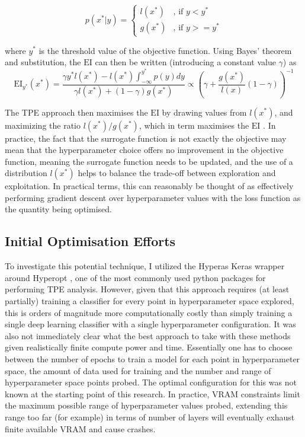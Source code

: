 \begin{equation}
    p(x^*|y) = \begin{cases} \textit{l}(x^*) & \mbox{, if }  y <y^* \\ \textit{g}(x^*) & \mbox{, if } y>=y^* \end{cases}
\end{equation}

where $y^*$ is the threshold value of the objective function. Using Bayes' theorem and substitution, the $\textrm{EI}$ can then be written (introducing a constant value $\gamma$) as 
\begin{equation}
    \textrm{EI}_{y^*}(x^*)=\frac{\gamma y^* \textit{l}(x^*)-\textit{l}(x^*)\int_{-\infty}^{y^*}p(y)dy}{\gamma \textit{l}(x^*)+(1-\gamma) \textit{g}(x^*)} \propto \left( \gamma +\frac{\textit{g}(x^*)}{\textit{l}(x)} (1-\gamma)\right)^{-1}
\end{equation}


The TPE approach then maximises the $\textrm{EI}$ by drawing values from $\textit{l}(x^*)$, and maximizing the ratio $\textit{l}(x^*)/\textit{g}(x^*)$, which in term maximises the $\textrm{EI}$ \cite{tdshyper}. In practice, the fact that the surrogate function is not exactly the objective may mean that the hyperparameter choice offers no improvement in the objective function, meaning the surrogate function needs to be updated, and the use of a distribution $\textit{l}(x^*)$ helps to balance the trade-off between exploration and exploitation. In practical terms, this can reasonably be thought of as effectively performing gradient descent over hyperparameter values with the loss function as the quantity being optimised.

\subsection{Initial Optimisation Efforts}

To investigate this potential technique, I utilized the Hyperas \cite{hyperas} Keras wrapper around Hyperopt \cite{hyperopt}, one of the most commonly used python packages for performing TPE analysis. However, given that this approach requires (at least partially) training a classifier for every point in hyperparameter space explored, this is orders of magnitude more computationally costly than simply training a single deep learning classifier with a single hyperparameter configuration. It was also not immediately clear what the best approach to take with these methods given realistically finite compute power and time. Essentially one has to choose between the number of epochs to train a model for each point in hyperparameter space, the amount of data used for training and the number and range of hyperparameter space points probed. The optimal configuration for this was not known at the starting point of this research. In practice, VRAM constraints limit the maximum possible range of hyperparameter values probed, extending this range too far (for example) in terms of number of layers will eventually exhaust finite available VRAM and cause crashes.

